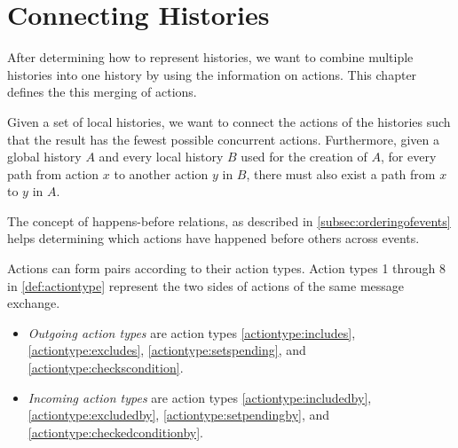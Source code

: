 \chapter{Connecting Histories} 
\label{chap:connecting-histories}
	After determining how to represent histories, we want to combine multiple histories into one history by using the information on actions. This chapter defines the this merging of actions. 
	
    \newpar
    Given a set of local histories, we want to connect the actions of the histories such that the result has the fewest possible concurrent actions. Furthermore, given a global history $A$ and every local history $B$ used for the creation of $A$, for every path from action $x$ to another action $y$ in $B$, there must also exist a path from $x$ to $y$ in $A$.
    
    
    \newpar
    The concept of happens-before relations, as described in \autoref{subsec:orderingofevents} helps determining which actions have happened before others across events. 
	
    \newpar
	Actions can form pairs according to their action types. Action types 1 through 8 in \autoref{def:actiontype} represent the two sides of actions of the same message exchange.
	
	\begin{itemize}
		\item \textit{Outgoing action types} are action types \ref{actiontype:includes}, \ref{actiontype:excludes}, \ref{actiontype:setspending}, and \ref{actiontype:checkscondition}.
		\item \textit{Incoming action types} are action types \ref{actiontype:includedby}, \ref{actiontype:excludedby}, \ref{actiontype:setpendingby}, and \ref{actiontype:checkedconditionby}. 
	\end{itemize}
		
